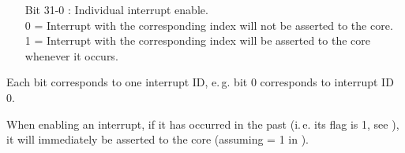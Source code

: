 \vspace{-2mm}
\begin{itemize}[leftmargin=18mm,labelsep=3mm,parsep=1.5mm]
    \item[\footnotesize Bit 31-0] : Individual interrupt enable.\\{\footnotesize
    0 = Interrupt with the corresponding index will not be asserted to the core.\\
    1 = Interrupt with the corresponding index will be asserted to the core whenever it occurs.}
\end{itemize}
Each bit corresponds to one interrupt ID, e.\,g. bit 0 corresponds to interrupt ID 0.

When enabling an interrupt, if it has occurred in the past (i.\,e. its flag is 1, see ), it will immediately be asserted to the core (assuming  = 1 in ).

\newpage
